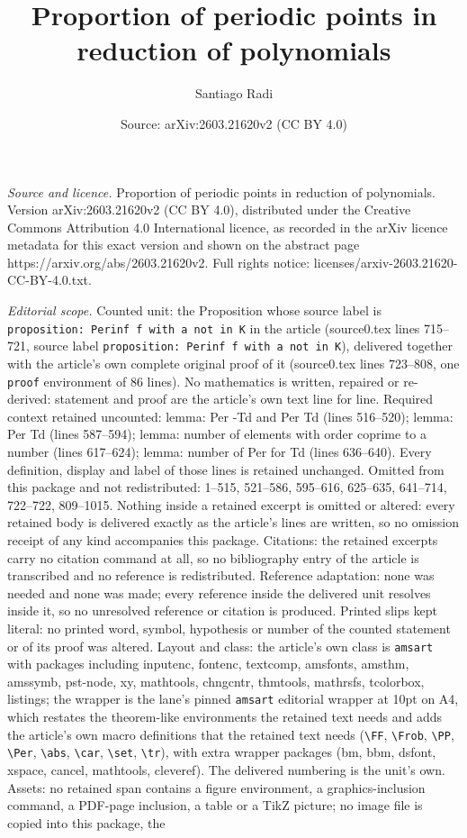\documentclass[10pt,a4paper]{amsart}
\title[Proportion of periodic points in reduction of polynomials]{Proportion of periodic points in reduction of polynomials}
\author{Santiago Radi}
\date{Source: arXiv:2603.21620v2 (CC BY 4.0)}
\begin{document}
\maketitle

\noindent\emph{Source and licence.} Proportion of periodic points in reduction of polynomials. Version arXiv:2603.21620v2 (CC BY 4.0), distributed under the Creative Commons Attribution 4.0 International licence, as recorded in the arXiv licence metadata for this exact version and shown on the abstract page https://arxiv.org/abs/2603.21620v2. Full rights notice: licenses/arxiv-2603.21620-CC-BY-4.0.txt.\par\smallskip

\noindent\textit{Editorial scope.} Counted unit: the Proposition whose source label is \texttt{proposition: Perinf f with a not in K} in the article (source0.tex lines 715--721, source label \texttt{proposition: Perinf f with a not in K}), delivered together with the article's own complete original proof of it (source0.tex lines 723--808, one \texttt{proof} environment of 86 lines). No mathematics is written, repaired or re-derived: statement and proof are the article's own text line for line. Required context retained uncounted: lemma: Per -Td and Per Td (lines 516--520); lemma: Per Td (lines 587--594); lemma: number of elements with order coprime to a number (lines 617--624); lemma: number of Per for Td (lines 636--640). Every definition, display and label of those lines is retained unchanged. Omitted from this package and not redistributed: 1--515, 521--586, 595--616, 625--635, 641--714, 722--722, 809--1015. Nothing inside a retained excerpt is omitted or altered: every retained body is delivered exactly as the article's lines are written, so no omission receipt of any kind accompanies this package. Citations: the retained excerpts carry no citation command at all, so no bibliography entry of the article is transcribed and no reference is redistributed. Reference adaptation: none was needed and none was made; every reference inside the delivered unit resolves inside it, so no unresolved reference or citation is produced. Printed slips kept literal: no printed word, symbol, hypothesis or number of the counted statement or of its proof was altered. Layout and class: the article's own class is \texttt{amsart} with packages including inputenc, fontenc, textcomp, amsfonts, amsthm, amssymb, pst-node, xy, mathtools, chngcntr, thmtools, mathrsfs, tcolorbox, listings; the wrapper is the lane's pinned \texttt{amsart} editorial wrapper at 10pt on A4, which restates the theorem-like environments the retained text needs and adds the article's own macro definitions that the retained text needs (\texttt{\textbackslash FF}, \texttt{\textbackslash Frob}, \texttt{\textbackslash PP}, \texttt{\textbackslash Per}, \texttt{\textbackslash abs}, \texttt{\textbackslash car}, \texttt{\textbackslash set}, \texttt{\textbackslash tr}), with extra wrapper packages (bm, bbm, dsfont, xspace, cancel, mathtools, cleveref). The delivered numbering is the unit's own. Assets: no retained span contains a figure environment, a graphics-inclusion command, a PDF-page inclusion, a table or a TikZ picture; no image file is copied into this package, the 
\end{document}
